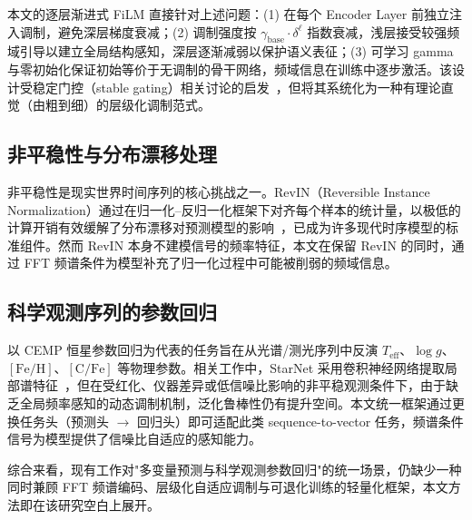 本文的逐层渐进式 FiLM 直接针对上述问题：(1) 在每个 Encoder Layer 前独立注入调制，避免深层梯度衰减；(2) 调制强度按 \(\gamma_{\text{base}} \cdot \delta^{\ell}\) 指数衰减，浅层接受较强频域引导以建立全局结构感知，深层逐渐减弱以保护语义表征；(3) 可学习 gamma 与零初始化保证初始等价于无调制的骨干网络，频域信息在训练中逐步激活。该设计受稳定门控（stable gating）相关讨论的启发~\cite{stable_gating}，但将其系统化为一种有理论直觉（由粗到细）的层级化调制范式。

\subsection{非平稳性与分布漂移处理}
非平稳性是现实世界时间序列的核心挑战之一。RevIN（Reversible Instance Normalization）通过在归一化--反归一化框架下对齐每个样本的统计量，以极低的计算开销有效缓解了分布漂移对预测模型的影响~\cite{revin}，已成为许多现代时序模型的标准组件。然而 RevIN 本身不建模信号的频率特征，本文在保留 RevIN 的同时，通过 FFT 频谱条件为模型补充了归一化过程中可能被削弱的频域信息。

\subsection{科学观测序列的参数回归}
以 CEMP 恒星参数回归为代表的任务旨在从光谱/测光序列中反演 \(T_{\mathrm{eff}}\)、\(\log g\)、\([\mathrm{Fe/H}]\)、\([\mathrm{C/Fe}]\) 等物理参数。相关工作中，StarNet 采用卷积神经网络提取局部谱特征~\cite{starnet}，但在受红化、仪器差异或低信噪比影响的非平稳观测条件下，由于缺乏全局频率感知的动态调制机制，泛化鲁棒性仍有提升空间。本文统一框架通过更换任务头（预测头 \(\to\) 回归头）即可适配此类 sequence-to-vector 任务，频谱条件信号为模型提供了信噪比自适应的感知能力。

综合来看，现有工作对"多变量预测与科学观测参数回归"的统一场景，仍缺少一种同时兼顾 FFT 频谱编码、层级化自适应调制与可退化训练的轻量化框架，本文方法即在该研究空白上展开。
